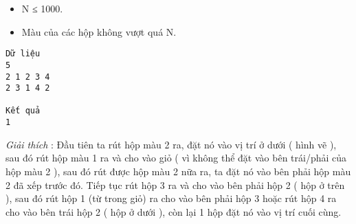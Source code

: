 \begin{itemize}
	\item     N ≤ 1000.   
	\item     Màu của các hộp không vượt quá N.   
\end{itemize}
\begin{verbatim}
Dữ liệu
5
2 1 2 3 4
2 3 1 4 2

Kết quả
1
\end{verbatim}

\textit{    Giải thích   }   : Đầu tiên ta rút hộp màu 2 ra, đặt nó vào vị   trí ở dưới ( hình vẽ ), sau đó rút hộp màu 1 ra và cho vào giỏ ( vì không thể đặt vào bên trái/phải của hộp màu 2 ), sau đó rút được hộp màu 2 nữa ra, ta đặt nó vào bên phải hộp màu 2 đã xếp trước đó. Tiếp tục rút hộp 3 ra và cho vào bên phải hộp 2 ( hộp ở trên ), sau đó rút hộp 1 (từ trong giỏ) ra cho vào bên phải hộp 3 hoặc rút hộp 4 ra cho vào bên trái hộp 2 ( hộp ở dưới ), còn lại 1 hộp đặt nó vào vị trí cuối cùng.
